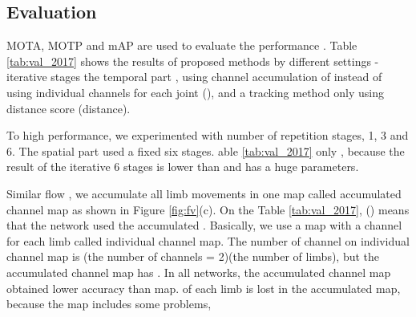 \documentclass[conference]{IEEEtran}
\begin{document}
\subsection{Evaluation}

MOTA, MOTP and mAP are used to evaluate the performance \cite{milan2016mot16}. Table \ref{tab:val_2017} shows the results of  proposed methods by different settings -  iterative stages  the temporal part , using channel accumulation of 
instead of using individual channels for each joint (), and a tracking method only using distance score  (distance). 

To  high performance, we experimented with  number of repetition stages, 1, 3 and 6. 
The spatial part used a fixed six stages. able \ref{tab:val_2017} only , because the  result of the iterative 6 stages is lower than  and has a huge  parameters. 

Similar  flow \cite{horn1981determining}, we accumulate all limb movements in one map called accumulated channel map as shown in Figure \ref{fig:fv}(c). On the Table \ref{tab:val_2017}, () means that the network used the accumulated . Basically, we use a map with a channel for each limb called individual channel map. The number of channel on individual channel map is (the number of  channels = 2)(the number of limbs), but the accumulated channel map has .
In all  networks, the accumulated channel map obtained lower accuracy than   map.   of each limb is lost in the accumulated map, because the map includes some problems,  
\end{document}
